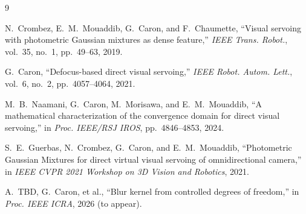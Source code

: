 \documentclass[11pt]{article}
\begin{document}
\begin{thebibliography}{9}

N.~Crombez, E.~M.~Mouaddib, G.~Caron, and F.~Chaumette,
``Visual servoing with photometric Gaussian mixtures as dense feature,''
\emph{IEEE Trans. Robot.}, vol.~35, no.~1, pp.~49--63, 2019.

G.~Caron,
``Defocus-based direct visual servoing,''
\emph{IEEE Robot. Autom. Lett.}, vol.~6, no.~2, pp.~4057--4064, 2021.

M.~B.~Naamani, G.~Caron, M.~Morisawa, and E.~M.~Mouaddib,
``A mathematical characterization of the convergence domain for direct visual servoing,''
in \emph{Proc. IEEE/RSJ IROS}, pp.~4846--4853, 2024.

S.~E.~Guerbas, N.~Crombez, G.~Caron, and E.~M.~Mouaddib,
``Photometric Gaussian Mixtures for direct virtual visual servoing of omnidirectional camera,''
in \emph{IEEE CVPR 2021 Workshop on 3D Vision and Robotics}, 2021.

A.~TBD, G.~Caron, et al.,
``Blur kernel from controlled degrees of freedom,''
in \emph{Proc. IEEE ICRA}, 2026 (to appear).

\end{thebibliography}
\end{document}
